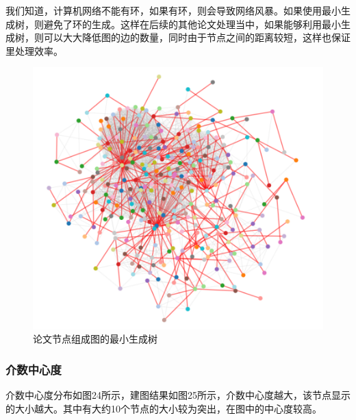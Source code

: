 \documentclass[UTF8, onecolumn, a4paper]{article}
\begin{document}
    我们知道，计算机网络不能有环，如果有环，则会导致网络风暴。如果使用最小生成树，则避免了环的生成。这样在后续的其他论文处理当中，如果能够利用最小生成树，则可以大大降低图的边的数量，同时由于节点之间的距离较短，这样也保证里处理效率。
\begin{figure}[H]
	\centering
	\includegraphics[width=0.6\linewidth]{../pictures/show18}
	\caption{论文节点组成图的最小生成树}
\end{figure}
\subsubsection{介数中心度}
    介数中心度分布如图24所示，建图结果如图25所示，介数中心度越大，该节点显示的大小越大。其中有大约10个节点的大小较为突出，在图中的中心度较高。
    
\end{document}
